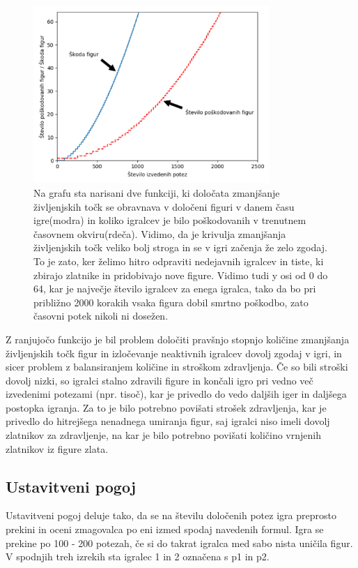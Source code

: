 \documentclass[a4paper, 12pt]{book}
\begin{document}
\begin{figure}[h!]
	\begin{center}
		\includegraphics[width=0.8\textwidth]{photos/destroy_formula_2018_11_17.pdf}
	\end{center}
	\caption{Na grafu sta narisani dve funkciji, ki določata zmanjšanje življenjskih točk se obravnava v določeni figuri v danem času igre(modra) in koliko igralcev je bilo poškodovanih v trenutnem časovnem okviru(rdeča).
	Vidimo, da je krivulja zmanjšanja življenjskih točk veliko bolj stroga in se v igri začenja že zelo zgodaj. 
	To je zato, ker želimo hitro odpraviti nedejavnih igralcev in tiste, ki zbirajo zlatnike in pridobivajo nove figure.
	Vidimo tudi y osi od 0 do 64, kar je največje število igralcev za enega igralca, tako da bo pri približno 2000 korakih vsaka figura dobil smrtno poškodbo, zato časovni potek nikoli ni dosežen.}
	\label{destroy_formula_2018_11_17}
\end{figure}

Z ranjujočo funkcijo je bil problem določiti pravšnjo stopnjo količine zmanjšanja življenjskih točk figur in izločevanje neaktivnih igralcev dovolj zgodaj v igri, in sicer problem z balansiranjem količine in stroškom zdravljenja. 
Če so bili stroški dovolj nizki, so igralci stalno zdravili figure in končali igro pri vedno več izvedenimi potezami (npr. tisoč), kar je privedlo do vedo daljših iger in daljšega postopka igranja.
Za to je bilo potrebno povišati strošek zdravljenja, kar je privedlo do hitrejšega nenadnega umiranja figur, saj igralci niso imeli dovolj zlatnikov za zdravljenje, na kar je bilo potrebno povišati količino vrnjenih zlatnikov iz figure zlata.

\subsection{Ustavitveni pogoj}
Ustavitveni pogoj deluje tako, da se na številu določenih potez igra preprosto prekini in oceni zmagovalca po eni izmed spodaj navedenih formul.
Igra se prekine po 100 - 200 potezah, če si do takrat igralca med sabo nista uničila figur.
V spodnjih treh izrekih sta igralec 1 in 2 označena s p1 in p2.
\end{document}
